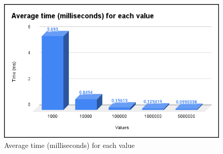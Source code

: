 \begin{figure}[!ht]
    \centering
    \includegraphics[scale=0.55]{document/chapters/chapter_7/images/experiment_results_avg_ms_per_value.png}
    \caption{Average time (milliseconds) for each value}
    \label{fig:experiment_results_avg_ms_per_value}
\end{figure}